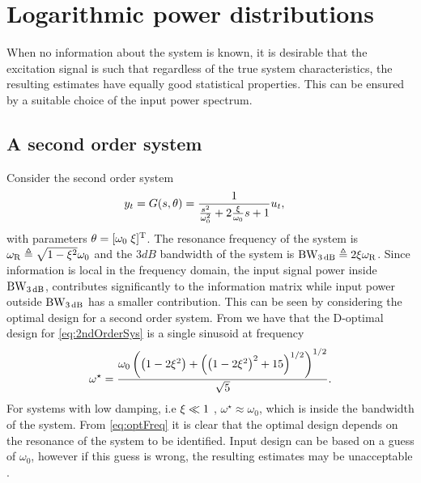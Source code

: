 

\section{Logarithmic power distributions}\label{sec:logarithmic}
When no information about the system is known, it is desirable that
the excitation signal is such that regardless of the true system characteristics,
the resulting estimates have equally good statistical properties.
This can be ensured by a suitable choice of the input power spectrum.

 \subsection{A second order system}
Consider the second order system
\begin{align}
y_t &= G(s,\theta)=\frac{1}{\frac{s^2}{\omega_0^2} + 2\frac{\xi}{\omega_0}s + 1}u_t,
\label{eq:2ndOrderSys}
\end{align}
with parameters $\theta=[\omega_0\;\xi]^{\mathrm{T}}$. The resonance frequency of the system is $\omega_{\mathrm{R}} \triangleq \sqrt{1-\xi^2}\omega_0$
and the $3\unit{dB}$ bandwidth of the system is $\mathrm{BW}_{3\,\mathrm{dB}} \triangleq 2\xi\omega_{\mathrm{R}}$.
Since information is local in the frequency domain, the input signal power inside $\mathrm{BW}_{3\,\mathrm{dB}}$, contributes significantly to the information matrix while input power outside $\mathrm{BW}_{3\,\mathrm{dB}}$ has a smaller contribution. This can be seen by considering the optimal design for a second order system. From \citep{Goodwin1977} we have that the D-optimal design for \eqref{eq:2ndOrderSys} is a single sinusoid at frequency
\begin{align}
\omega^\star =\frac{\omega_0\left(\left(1-2\xi^2\right)+\left(\left(1-2\xi^2\right)^2+15\right)^{1/2}\right)^{1/2}}{\sqrt{5}}.
\label{eq:optFreq}
\end{align}
For systems with low damping, i.e $\xi\ll1$ , $\omega^\star\approx\omega_0$, which is inside the bandwidth of the system. From \eqref{eq:optFreq} it is clear that the optimal design depends on the resonance of the system to be identified. Input design can be based on a guess of $\omega_0$, however if this guess is wrong, the resulting estimates may be unacceptable \citep{Rojas2007}.

